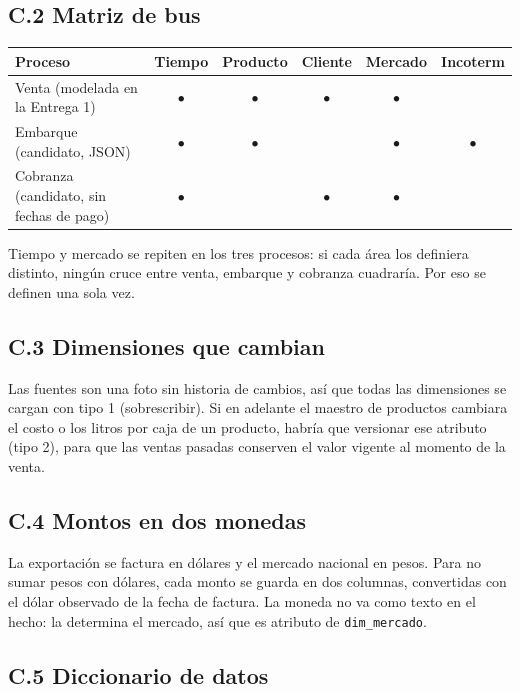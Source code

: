 \subsection*{C.2 Matriz de bus}

\begin{center}
\small
\begin{tabular}{@{}lccccc@{}}
\toprule
Proceso & Tiempo & Producto & Cliente & Mercado & Incoterm \\
\midrule
Venta (modelada en la Entrega 1) & $\bullet$ & $\bullet$ & $\bullet$ & $\bullet$ & \\
Embarque (candidato, JSON) & $\bullet$ & $\bullet$ & & $\bullet$ & $\bullet$ \\
Cobranza (candidato, sin fechas de pago) & $\bullet$ & & $\bullet$ & $\bullet$ & \\
\bottomrule
\end{tabular}
\end{center}

Tiempo y mercado se repiten en los tres procesos: si cada área los definiera distinto, ningún cruce entre venta, embarque y cobranza cuadraría. Por eso se definen una sola vez.

\subsection*{C.3 Dimensiones que cambian}

Las fuentes son una foto sin historia de cambios, así que todas las dimensiones se cargan con tipo 1 (sobrescribir). Si en adelante el maestro de productos cambiara el costo o los litros por caja de un producto, habría que versionar ese atributo (tipo 2), para que las ventas pasadas conserven el valor vigente al momento de la venta.

\subsection*{C.4 Montos en dos monedas}

La exportación se factura en dólares y el mercado nacional en pesos. Para no sumar pesos con dólares, cada monto se guarda en dos columnas, convertidas con el dólar observado de la fecha de factura. La moneda no va como texto en el hecho: la determina el mercado, así que es atributo de \texttt{dim\_mercado}.

\subsection*{C.5 Diccionario de datos}


